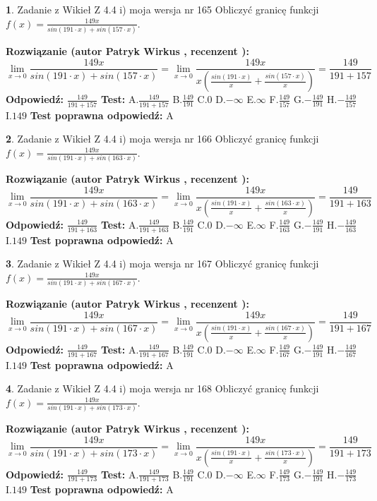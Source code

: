 \documentclass[12pt, a4paper]{article}
\theoremstyle{definition} %
\newtheorem{zad}{}
\newcommand{\zadStart}[1]{\begin{zad}#1\newline}
\newcommand{\zadStop}{\end{zad}}
\newcommand{\rozwStart}[2]{\noindent \textbf{Rozwiązanie (autor #1 , recenzent #2): }\newline}
\newcommand{\rozwStop}{\newline}
\newcommand{\odpStart}{\noindent \textbf{Odpowiedź:}\newline}
\newcommand{\odpStop}{\newline}
\newcommand{\testStart}{\noindent \textbf{Test:}\newline}
\newcommand{\testStop}{\newline}
\newcommand{\kluczStart}{\noindent \textbf{Test poprawna odpowiedź:}\newline}
\newcommand{\kluczStop}{\newline}
\begin{document}
\zadStart{Zadanie z Wikieł Z 4.4 i) moja wersja nr 165}
Obliczyć granicę funkcji $f(x)=\frac{149x}{sin(191\cdot x) +sin(157\cdot x)}$.
\zadStop
\rozwStart{Patryk Wirkus}{}
$$\lim\limits_{x\to 0}\frac{149x}{sin(191\cdot x) +sin(157\cdot x)}=\lim\limits_{x\to 0}\frac{149x}{x(\frac{sin(191\cdot x)}{x}+\frac{sin(157\cdot x)}{x})}=\frac{149}{191+157}$$
\rozwStop
\odpStart
$\frac{149}{191+157}$
\odpStop
\testStart
A.$\frac{149}{191+157}$
B.$\frac{149}{191}$
C.$0$
D.$-\infty$
E.$\infty$
F.$\frac{149}{157}$
G.$-\frac{149}{191}$
H.$-\frac{149}{157}$
I.$149$
\testStop
\kluczStart
A
\kluczStop



\zadStart{Zadanie z Wikieł Z 4.4 i) moja wersja nr 166}
Obliczyć granicę funkcji $f(x)=\frac{149x}{sin(191\cdot x) +sin(163\cdot x)}$.
\zadStop
\rozwStart{Patryk Wirkus}{}
$$\lim\limits_{x\to 0}\frac{149x}{sin(191\cdot x) +sin(163\cdot x)}=\lim\limits_{x\to 0}\frac{149x}{x(\frac{sin(191\cdot x)}{x}+\frac{sin(163\cdot x)}{x})}=\frac{149}{191+163}$$
\rozwStop
\odpStart
$\frac{149}{191+163}$
\odpStop
\testStart
A.$\frac{149}{191+163}$
B.$\frac{149}{191}$
C.$0$
D.$-\infty$
E.$\infty$
F.$\frac{149}{163}$
G.$-\frac{149}{191}$
H.$-\frac{149}{163}$
I.$149$
\testStop
\kluczStart
A
\kluczStop



\zadStart{Zadanie z Wikieł Z 4.4 i) moja wersja nr 167}
Obliczyć granicę funkcji $f(x)=\frac{149x}{sin(191\cdot x) +sin(167\cdot x)}$.
\zadStop
\rozwStart{Patryk Wirkus}{}
$$\lim\limits_{x\to 0}\frac{149x}{sin(191\cdot x) +sin(167\cdot x)}=\lim\limits_{x\to 0}\frac{149x}{x(\frac{sin(191\cdot x)}{x}+\frac{sin(167\cdot x)}{x})}=\frac{149}{191+167}$$
\rozwStop
\odpStart
$\frac{149}{191+167}$
\odpStop
\testStart
A.$\frac{149}{191+167}$
B.$\frac{149}{191}$
C.$0$
D.$-\infty$
E.$\infty$
F.$\frac{149}{167}$
G.$-\frac{149}{191}$
H.$-\frac{149}{167}$
I.$149$
\testStop
\kluczStart
A
\kluczStop



\zadStart{Zadanie z Wikieł Z 4.4 i) moja wersja nr 168}
Obliczyć granicę funkcji $f(x)=\frac{149x}{sin(191\cdot x) +sin(173\cdot x)}$.
\zadStop
\rozwStart{Patryk Wirkus}{}
$$\lim\limits_{x\to 0}\frac{149x}{sin(191\cdot x) +sin(173\cdot x)}=\lim\limits_{x\to 0}\frac{149x}{x(\frac{sin(191\cdot x)}{x}+\frac{sin(173\cdot x)}{x})}=\frac{149}{191+173}$$
\rozwStop
\odpStart
$\frac{149}{191+173}$
\odpStop
\testStart
A.$\frac{149}{191+173}$
B.$\frac{149}{191}$
C.$0$
D.$-\infty$
E.$\infty$
F.$\frac{149}{173}$
G.$-\frac{149}{191}$
H.$-\frac{149}{173}$
I.$149$
\testStop
\kluczStart
A
\kluczStop
\end{document}
